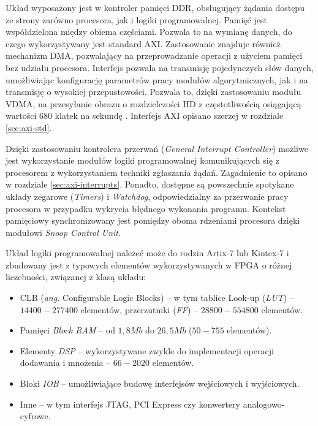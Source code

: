 Układ wyposażony jest w kontroler pamięci DDR, obsługujący żądania dostępu ze strony zarówno procesora, jak i logiki programowalnej. 
Pamięć jest współdzielona między obiema częściami.
Pozwala to na wymianę danych, do czego wykorzystywany jest standard AXI. 
Zastosowanie znajduje również mechanizm DMA, pozwalający na przeprowadzanie operacji z użyciem pamięci bez udziału procesora. 
Interfejs pozwala na transmisję pojedynczych słów danych, umożliwiając konfigurację parametrów pracy modułów algorytmicznych, jak i na transmisję o wysokiej przepustowości. 
Pozwala to, dzięki zastosowaniu modułu VDMA, na przesyłanie obrazu o rozdzielczości HD z częstotliwością osiągającą wartości 680 klatek na sekundę \cite{axi-vdma-guide}. 
Interfejs AXI opisano szerzej w rozdziale \ref{sec:axi-std}.

Dzięki zastosowaniu kontrolera przerwań (\emph{General Interrupt Controller}) możliwe jest wykorzystanie modułów logiki programowalnej komunikujących się z procesorem z wykorzystaniem techniki zgłaszania żądań. Zagadnienie to opisano w rozdziale \ref{sec:axi-interrupts}.
Ponadto, dostępne są powszechnie spotykane układy zegarowe (\emph{Timers}) i \emph{Watchdog}, odpowiedzialny za przerwanie pracy procesora w przypadku wykrycia błędnego wykonania programu.
Kontekst pamięciowy synchronizowany jest pomiędzy oboma rdzeniami procesora dzięki modułowi \emph{Snoop Control Unit}.

Układ logiki programowalnej należeć może do rodzin Artix-7 lub Kintex-7 i zbudowany jest z typowych elementów wykorzystywanych w FPGA o różnej liczebności, związanej z klasą układu:
\begin{itemize}
	\item CLB (\emph{ang.} Configurable Logic Blocks) -- w tym tablice Look-up (\emph{LUT}) -- $14400 - 277400$ elementów, przerzutniki (\emph{FF}) -- $28800 - 554800$ elementów.
	
	\item Pamięci \emph{Block RAM} -- od $1,8Mb$ do $26,5Mb$ ($50 - 755$ elementów).
	
	\item Elementy \emph{DSP} -- wykorzystywane zwykle do implementacji operacji dodawania i mnożenia -- $66 - 2020$ elementów.
	
	\item Bloki \emph{IOB} -- umożliwiające budowę interfejsów wejściowych i wyjściowych.
	
	\item Inne -- w tym interfejs JTAG, PCI Express czy konwertery analogowo-cyfrowe.
\end{itemize}

